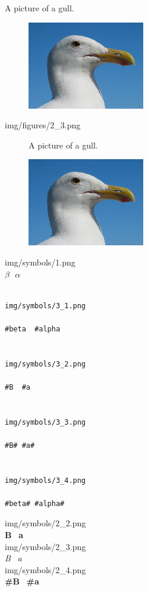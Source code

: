\documentclass[14pt]{article}
\begin{document}
A picture of a gull.
\begin{figure}[H]
\includegraphics[scale=1]{../../img/gull.png}
\end{figure}
\newpage
\noindent
img/figures/2\_3.png\\[.5cm]
\begin{figure}[H]
\begin{center}
\fontsize{14}{14}\selectfont
A picture of a gull.\\
\setlength{\itemsep}{12pt}
\setlength{\parskip}{12pt}
\setlength{\parsep}{12pt}

\includegraphics[scale=1]{../../img/gull.png}
\end{center}
\end{figure}
\noindent
img/symbols/1.png\\[.5cm]
$\beta\ \ \  \alpha$
\begin{verbatim}

img/symbols/3_1.png

#beta  #alpha


img/symbols/3_2.png

#B  #a


img/symbols/3_3.png

#B# #a#


img/symbols/3_4.png

#beta# #alpha#

\end{verbatim}
\noindent
img/symbols/2\_2.png\\[.5cm]
\textbf{B} \ \textbf{a}\\[.5cm]
img/symbols/2\_3.png\\[.5cm]
\textit{B} \ \textit{a}\\[.5cm]
img/symbols/2\_4.png\\[.5cm]
\textbf{\#B} \ \textbf{\#a}\\[.5cm]
\end{document}
